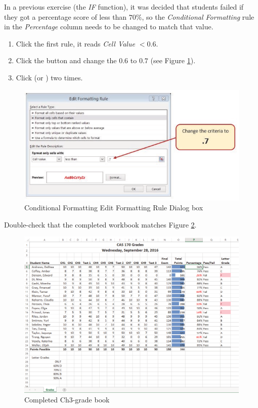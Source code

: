 In a previous exercise (the \textit{IF} function), it was decided that students failed if they got a percentage score of less than $ 70\% $, so the \textit{Conditional Formatting} rule in the \textit{Percentage} column needs to be changed to match that value.

\begin{enumbox}
	\begin{enumerate}
		\item Click the first rule, it reads \textit{Cell Value $ <0.6 $}.
		\item Click the  button and change the $ 0.6 $ to $ 0.7 $ (see Figure \ref{03:fig24}).
		\item Click  (or ) two times.
	\end{enumerate}
\end{enumbox}
	
\begin{figure}[H]
	\centering
	\includegraphics[width=\maxwidth{.95\linewidth}]{gfx/ch03_fig24}
	\caption{Conditional Formatting Edit Formatting Rule Dialog box}
	\label{03:fig24}
\end{figure}

Double-check that the completed workbook matches Figure \ref{03:fig25}.

\begin{figure}[H]
	\centering
	\includegraphics[width=\maxwidth{.95\linewidth}]{gfx/ch03_fig25}
	\caption{Completed Ch3-grade book}
	\label{03:fig25}
\end{figure}

